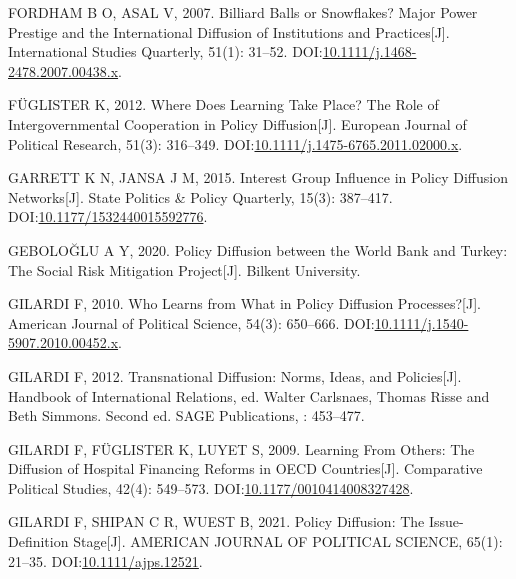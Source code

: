 \documentclass[
  12pt,
]{ctexart}
\newlength{\cslhangindent}
\newlength{\cslentryspacingunit} %
\newenvironment{CSLReferences}[2] %
 {%
  \setlength{\parindent}{0pt}
  \ifodd #1
  \let\oldpar\par
  \def\par{\hangindent=\cslhangindent\oldpar}
  \fi
  \setlength{\parskip}{#2\cslentryspacingunit}
 }%
 {}
\begin{document}
\begin{CSLReferences}{1}{0}
\leavevmode{}%
FORDHAM B O, ASAL V, 2007. Billiard {Balls} or {Snowflakes}? {Major Power Prestige} and the {International Diffusion} of {Institutions} and {Practices}{[}J{]}. International Studies Quarterly, 51(1): 31--52. DOI:\href{https://doi.org/10.1111/j.1468-2478.2007.00438.x}{10.1111/j.1468-2478.2007.00438.x}.

\leavevmode{}%
FÜGLISTER K, 2012. Where Does Learning Take Place? {The} Role of Intergovernmental Cooperation in Policy Diffusion{[}J{]}. European Journal of Political Research, 51(3): 316--349. DOI:\href{https://doi.org/10.1111/j.1475-6765.2011.02000.x}{10.1111/j.1475-6765.2011.02000.x}.

\leavevmode{}%
GARRETT K N, JANSA J M, 2015. Interest {Group Influence} in {Policy Diffusion Networks}{[}J{]}. State Politics \& Policy Quarterly, 15(3): 387--417. DOI:\href{https://doi.org/10.1177/1532440015592776}{10.1177/1532440015592776}.

\leavevmode{}%
GEBOLOĞLU A Y, 2020. Policy Diffusion between the {World Bank} and {Turkey}: The Social Risk Mitigation Project{[}J{]}. {Bilkent University}.

\leavevmode{}%
GILARDI F, 2010. Who {Learns} from {What} in {Policy Diffusion Processes}?{[}J{]}. American Journal of Political Science, 54(3): 650--666. DOI:\href{https://doi.org/10.1111/j.1540-5907.2010.00452.x}{10.1111/j.1540-5907.2010.00452.x}.

\leavevmode{}%
GILARDI F, 2012. Transnational Diffusion: {Norms}, Ideas, and Policies{[}J{]}. Handbook of International Relations, ed. Walter Carlsnaes, Thomas Risse and Beth Simmons. Second ed. SAGE Publications, : 453--477.

\leavevmode{}%
GILARDI F, FÜGLISTER K, LUYET S, 2009. Learning {From Others}: {The Diffusion} of {Hospital Financing Reforms} in {OECD Countries}{[}J{]}. Comparative Political Studies, 42(4): 549--573. DOI:\href{https://doi.org/10.1177/0010414008327428}{10.1177/0010414008327428}.

\leavevmode{}%
GILARDI F, SHIPAN C R, WUEST B, 2021. Policy {Diffusion}: {The Issue-Definition Stage}{[}J{]}. AMERICAN JOURNAL OF POLITICAL SCIENCE, 65(1): 21--35. DOI:\href{https://doi.org/10.1111/ajps.12521}{10.1111/ajps.12521}.


\end{CSLReferences}
\end{document}
